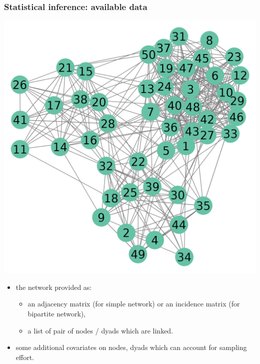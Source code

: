 \documentclass[compress,10pt]{beamer}
\begin{document}
\begin{frame} \frametitle{Statistical inference: available data}
 
\begin{center}
 \includegraphics[scale=.45]{plots/network_raw.png}
\end{center}

\begin{itemize}
 \item  the network provided as:
\begin{itemize}
 \item an adjacency matrix (for simple network) or an incidence matrix (for bipartite network),
 \item a list of pair of nodes / dyads which are linked.
\end{itemize}

\item some additional covariates on nodes, dyads which can account for sampling effort.
 \end{itemize}
\end{frame}
\end{document}
